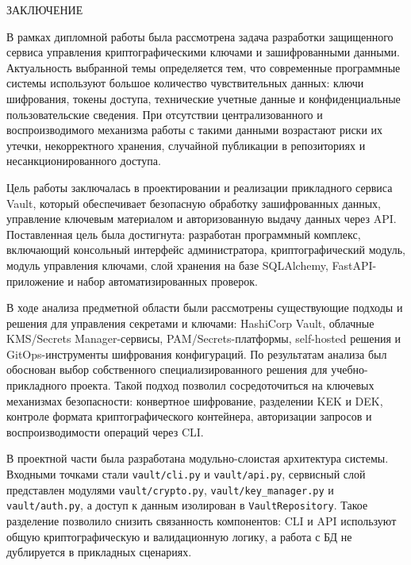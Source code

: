 \documentclass[14pt, a4paper]{extarticle}
\begin{document}
\clearpage
	
	\newpage
	

	\begin{center}
		ЗАКЛЮЧЕНИЕ
	\end{center}
	
	\vspace*{-0.2cm}
	
	В рамках дипломной работы была рассмотрена задача разработки защищенного сервиса управления криптографическими ключами и зашифрованными данными. Актуальность выбранной темы определяется тем, что современные программные системы используют большое количество чувствительных данных: ключи шифрования, токены доступа, технические учетные данные и конфиденциальные пользовательские сведения. При отсутствии централизованного и воспроизводимого механизма работы с такими данными возрастают риски их утечки, некорректного хранения, случайной публикации в репозиториях и несанкционированного доступа.
	
	Цель работы заключалась в проектировании и реализации прикладного сервиса Vault, который обеспечивает безопасную обработку зашифрованных данных, управление ключевым материалом и авторизованную выдачу данных через API. Поставленная цель была достигнута: разработан программный комплекс, включающий консольный интерфейс администратора, криптографический модуль, модуль управления ключами, слой хранения на базе SQLAlchemy, FastAPI-приложение и набор автоматизированных проверок.
	
	В ходе анализа предметной области были рассмотрены существующие подходы и решения для управления секретами и ключами: HashiCorp Vault, облачные KMS/Secrets Manager-сервисы, PAM/Secrets-платформы, self-hosted решения и GitOps-инструменты шифрования конфигураций. По результатам анализа был обоснован выбор собственного специализированного решения для учебно-прикладного проекта. Такой подход позволил сосредоточиться на ключевых механизмах безопасности: конвертное шифрование, разделении KEK и DEK, контроле формата криптографического контейнера, авторизации запросов и воспроизводимости операций через CLI.
	
	В проектной части была разработана модульно-слоистая архитектура системы. Входными точками стали \texttt{vault/cli.py} и \texttt{vault/api.py}, сервисный слой представлен модулями \texttt{vault/crypto.py}, \texttt{vault/key\_manager.py} и \texttt{vault/auth.py}, а доступ к данным изолирован в \texttt{VaultRepository}. Такое разделение позволило снизить связанность компонентов: CLI и API используют общую криптографическую и валидационную логику, а работа с БД не дублируется в прикладных сценариях.
	
\end{document}
